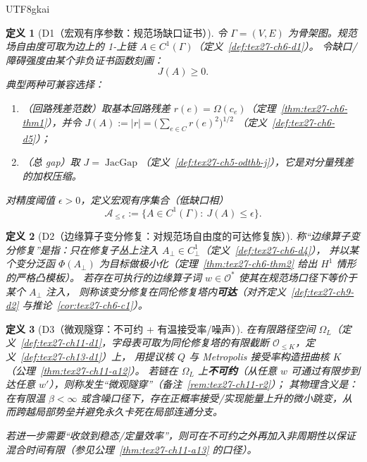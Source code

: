 \documentclass[12pt]{article}
\newtheorem{definition}{定义}[section]
\newcommand{\JacGap}{\operatorname{JacGap}}
\begin{document}
\begin{CJK*}{UTF8}{gkai}
\begin{definition}[D1（宏观有序参数：规范场缺口证书）]
\label{def:tex27-ch14-d1}
令 $\Gamma=(V,E)$ 为骨架图。规范场自由度可取为边上的 1-上链 $A\in C^1(\Gamma)$（定义~\ref{def:tex27-ch6-d1}）。
令缺口/障碍强度由某个非负证书函数刻画：
\[
  J(A)\ge 0.
\]
典型两种可兼容选择：
\begin{enumerate}
  \item（回路残差范数）取基本回路残差 $r(e)=\Omega(c_e)$（定理~\ref{thm:tex27-ch6-thm1}），并令
  $
    J(A):=|r|=\big(\sum_{e\in C}r(e)^2\big)^{1/2}
  $
  （定义~\ref{def:tex27-ch6-d5}）；
  \item（总 gap）取 $J=\JacGap$（定义~\ref{def:tex27-ch5-odthb-j}），它是对分量残差的加权压缩。
\end{enumerate}
对精度阈值 $\epsilon>0$，定义宏观有序集合（低缺口相）
\[
  \mathcal{A}_{\le\epsilon}:=\{A\in C^1(\Gamma):\ J(A)\le \epsilon\}.
\]
\end{definition}

\begin{definition}[D2（边缘算子变分修复：对规范场自由度的可达修复族）]
\label{def:tex27-ch14-d2}
称“边缘算子变分修复”是指：只在修复子丛上注入 $A_{\perp}\in C^1_{\perp}$（定义~\ref{def:tex27-ch6-d4}），
并以某个变分泛函 $\Phi(A_{\perp})$ 为目标做极小化（定理~\ref{thm:tex27-ch6-thm2} 给出 $H^1$ 情形的严格凸模板）。
若存在可执行的边缘算子词 $w\in\mathcal{O}^*$ 使其在规范场口径下等价于某个 $A_{\perp}$ 注入，
则称该变分修复在同伦修复塔内\textbf{可达}（对齐定义~\ref{def:tex27-ch9-d2} 与推论~\ref{cor:tex27-ch6-c1}）。
\end{definition}

\begin{definition}[D3（微观隧穿：不可约 + 有温接受率/噪声）]
\label{def:tex27-ch14-d3}
在有限路径空间 $\Omega_L$（定义~\ref{def:tex27-ch11-d1}，字母表可取为同伦修复塔的有限截断 $\mathcal{O}_{\le K}$，定义~\ref{def:tex27-ch13-d1}）上，
用提议核 $Q$ 与 Metropolis 接受率构造扭曲核 $K$（公理~\ref{thm:tex27-ch11-a12}）。
若链在 $\Omega_L$ 上\textbf{不可约}（从任意 $w$ 可通过有限步到达任意 $w'$），则称发生“微观隧穿”（备注~\ref{rem:tex27-ch11-r2}）；
其物理含义是：在有限温 $\beta<\infty$ 或含噪口径下，存在正概率接受/实现能量上升的微小跳变，从而跨越局部势垒并避免永久卡死在局部连通分支。

若进一步需要“收敛到稳态/定量效率”，则可在不可约之外再加入非周期性以保证混合时间有限（参见公理~\ref{thm:tex27-ch11-a13} 的口径）。
\end{definition}


\end{CJK*}
\end{document}
